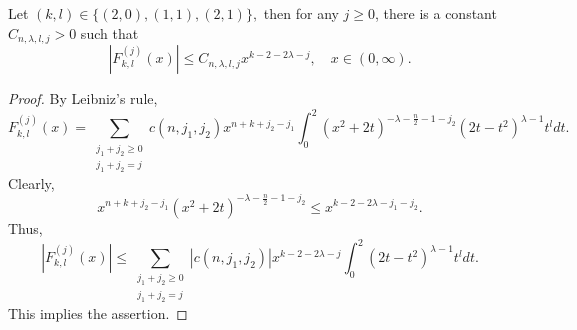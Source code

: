 \documentclass[12pt]{amsart}
\begin{document}
\begin{lemma}\label{fourth fkl lemma} Let $(k,l)\in\{(2,0),(1,1),(2,1)\},$ then for any $j\geq0$, there is a constant $C_{n,\lambda,l,j}>0$ such that
$$|F_{k,l}^{(j)}(x)|\leq C_{n,\lambda,l,j}x^{k-2-2\lambda-j},\quad x\in (0,\infty).$$
\end{lemma}
\begin{proof}
By Leibniz's rule,
$$F_{k,l}^{(j)}(x)=\sum_{\substack{j_1+j_2\geq0\\ j_1+j_2=j}}c(n,j_1,j_2)x^{n+k+j_2-j_1}\int_0^2(x^2+2t)^{-\lambda-\frac{n}{2}-1-j_2}(2t-t^2)^{\lambda-1}t^ldt.$$
Clearly,
$$x^{n+k+j_2-j_1}(x^2+2t)^{-\lambda-\frac{n}{2}-1-j_2}\leq x^{k-2-2\lambda-j_1-j_2}.$$
Thus,
$$|F_{k,l}^{(j)}(x)|\leq\sum_{\substack{j_1+j_2\geq0\\ j_1+j_2=j}}|c(n,j_1,j_2)|x^{k-2-2\lambda-j}\int_0^2(2t-t^2)^{\lambda-1}t^ldt.$$
This implies the assertion.
\end{proof}
\end{document}
